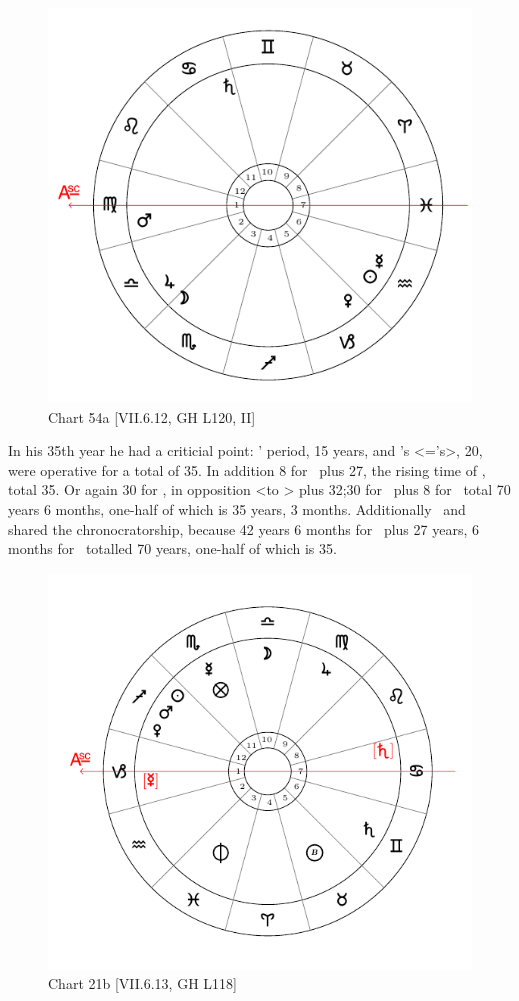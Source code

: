 \begin{figure}
\centering
\vspace{-20pt}
\includegraphics[width=.68\textwidth]{charts/5_09_1}
\caption{Chart 54a [VII.6.12, GH L120, II] }
\label{fig:chart54a}
\end{figure} 

In his 35th year he had a criticial point: \Mars’ period, 15 years, and \Virgo’s <=\Mercury’s>, 20, were operative for a total of 35. In addition 8 for \Venus\, plus 27, the rising time of \Capricorn, total 35. Or again 30 for \Saturn, in opposition <to \Venus>
plus 32;30 for \Cancer\, plus 8 for \Venus\, total 70 years 6 months, one-half of which is 35 years, 3 months. Additionally \Jupiter\, and \Saturn\, shared the chronocratorship, because 42 years 6 months for \Libra\, plus 27 years, 6 months for \Cancer\, totalled 70 years, one-half of which is 35.

\newpage
\begin{figure}
\centering
\vspace{0pt}
\includegraphics[width=.68\textwidth]{charts/2_36_2}
\caption{Chart 21b [VII.6.13, GH L118] }
\label{fig:chart21b}
\end{figure} 

